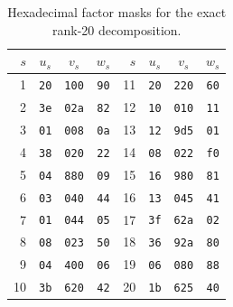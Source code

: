 \documentclass[10pt]{article}
\theoremstyle{remark}
\begin{document}
\begin{table}[ht]
\centering
\caption{Hexadecimal factor masks for the exact rank-20 decomposition.}
\label{tab:witness}
\small
\begin{tabular}{@{}rccc@{\qquad}rccc@{}}
\toprule
$s$ & $u_s$ & $v_s$ & $w_s$ & $s$ & $u_s$ & $v_s$ & $w_s$\\
\midrule
1  & \texttt{20} & \texttt{100} & \texttt{90} &
11 & \texttt{20} & \texttt{220} & \texttt{60}\\
2  & \texttt{3e} & \texttt{02a} & \texttt{82} &
12 & \texttt{10} & \texttt{010} & \texttt{11}\\
3  & \texttt{01} & \texttt{008} & \texttt{0a} &
13 & \texttt{12} & \texttt{9d5} & \texttt{01}\\
4  & \texttt{38} & \texttt{020} & \texttt{22} &
14 & \texttt{08} & \texttt{022} & \texttt{f0}\\
5  & \texttt{04} & \texttt{880} & \texttt{09} &
15 & \texttt{16} & \texttt{980} & \texttt{81}\\
6  & \texttt{03} & \texttt{040} & \texttt{44} &
16 & \texttt{13} & \texttt{045} & \texttt{41}\\
7  & \texttt{01} & \texttt{044} & \texttt{05} &
17 & \texttt{3f} & \texttt{62a} & \texttt{02}\\
8  & \texttt{08} & \texttt{023} & \texttt{50} &
18 & \texttt{36} & \texttt{92a} & \texttt{80}\\
9  & \texttt{04} & \texttt{400} & \texttt{06} &
19 & \texttt{06} & \texttt{080} & \texttt{88}\\
10 & \texttt{3b} & \texttt{620} & \texttt{42} &
20 & \texttt{1b} & \texttt{625} & \texttt{40}\\
\bottomrule
\end{tabular}
\end{table}
\end{document}
